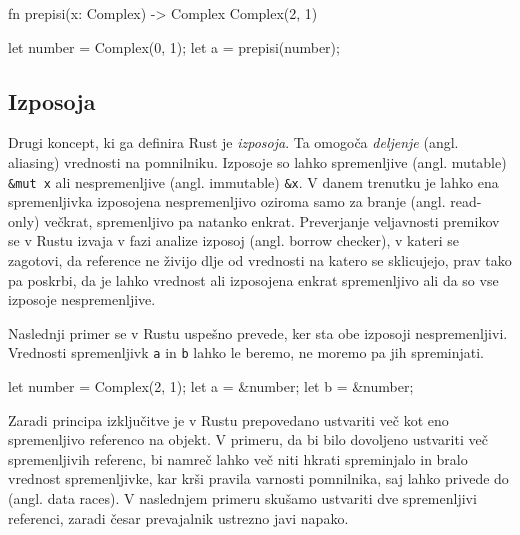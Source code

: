 \begin{rust-success}
fn prepisi(x: Complex) -> Complex { Complex(2, 1) }

let number = Complex(0, 1);
let a = prepisi(number);
\end{rust-success}


\subsection{Izposoja}

Drugi koncept, ki ga definira Rust je \textit{izposoja}. Ta omogoča \textit{deljenje} (angl. aliasing) vrednosti na pomnilniku. Izposoje so lahko spremenljive (angl. mutable) \texttt{\&mut x} ali nespremenljive (angl. immutable) \texttt{\&x}. V danem trenutku je lahko ena spremenljivka izposojena nespremenljivo oziroma samo za branje (angl. read-only) večkrat, spremenljivo pa natanko enkrat. Preverjanje veljavnosti premikov se v Rustu izvaja v fazi analize izposoj (angl. borrow checker), v kateri se zagotovi, da reference ne živijo dlje od vrednosti na katero se sklicujejo, prav tako pa poskrbi, da je lahko vrednost ali izposojena enkrat spremenljivo ali da so vse izposoje nespremenljive.

Naslednji primer se v Rustu uspešno prevede, ker sta obe izposoji nespremenljivi. Vrednosti spremenljivk \texttt{a} in \texttt{b} lahko le beremo, ne moremo pa jih spreminjati.

\begin{rust-success}
let number = Complex(2, 1);
let a = &number;
let b = &number;
\end{rust-success}

Zaradi principa izključitve je v Rustu prepovedano ustvariti več kot eno spremenljivo referenco na objekt. V primeru, da bi bilo dovoljeno ustvariti več spremenljivih referenc, bi namreč lahko več niti hkrati spreminjalo in bralo vrednost spremenljivke, kar krši pravila varnosti pomnilnika, saj lahko privede do  (angl. data races). V naslednjem primeru skušamo ustvariti dve spremenljivi referenci, zaradi česar prevajalnik ustrezno javi napako.

